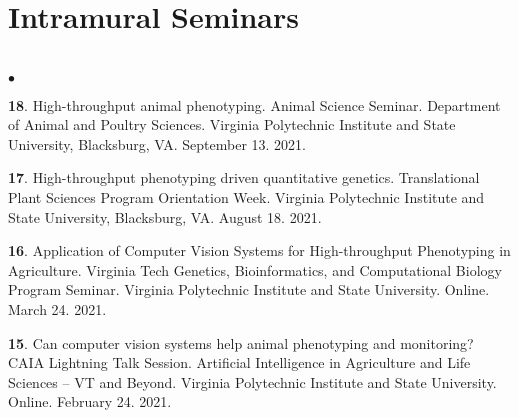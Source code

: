 \documentclass[margin,line,10pt]{res}
\newenvironment{list2}{
  \begin{list}{$\bullet$}{%
      \setlength{\itemsep}{0in}
      \setlength{\parsep}{0in} \setlength{\parskip}{0in}
      \setlength{\topsep}{0in} \setlength{\partopsep}{0in} 
      \setlength{\leftmargin}{0.2in}}}{\end{list}}
\begin{document}
\begin{resume}



\vspace{0.5cm}
\section{\sc Intramural Seminars}
\vspace{1cm}

\section{}
\begin{list2}

  \item  [{\bf 18}.] High-throughput animal phenotyping. Animal Science Seminar. Department of Animal and Poultry Sciences. Virginia Polytechnic Institute and State University, Blacksburg, VA. September 13. 2021. 

    \vspace{0.5cm}


    \item [{\bf 17}.] High-throughput phenotyping driven quantitative genetics. Translational Plant Sciences Program Orientation Week. Virginia Polytechnic Institute and State University, Blacksburg, VA. August 18. 2021.

          \vspace{0.5cm}

\item [{\bf 16}.] Application of Computer Vision Systems for High-throughput Phenotyping in Agriculture. Virginia Tech Genetics, Bioinformatics, and Computational Biology Program Seminar. Virginia Polytechnic Institute and State University. Online. March 24. 2021.

  \vspace{0.5cm}


  \item [{\bf 15}.] Can computer vision systems help animal phenotyping and monitoring? CAIA Lightning Talk Session. Artificial Intelligence in Agriculture and Life Sciences – VT and Beyond. Virginia Polytechnic Institute and State University. Online. February 24. 2021.
\end{list2}






\end{resume}
\end{document}

